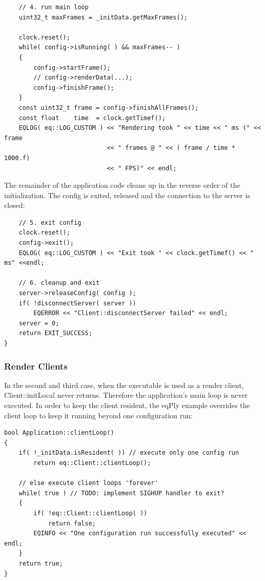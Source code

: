 \documentclass[10pt,a4]{scrartcl}
\begin{document}
{\footnotesize\begin{lstlisting}
    // 4. run main loop
    uint32_t maxFrames = _initData.getMaxFrames();
    
    clock.reset();
    while( config->isRunning( ) && maxFrames-- )
    {
        config->startFrame();
        // config->renderData(...);
        config->finishFrame();
    }
    const uint32_t frame = config->finishAllFrames();
    const float    time  = clock.getTimef();
    EQLOG( eq::LOG_CUSTOM ) << "Rendering took " << time << " ms (" << frame
                            << " frames @ " << ( frame / time * 1000.f)
                            << " FPS)" << endl;
\end{lstlisting}}%

The remainder of the application code cleans up in the reverse order of
the initialization. The config is exited, released and the connection to
the server is closed:

{\footnotesize\begin{lstlisting}
    // 5. exit config
    clock.reset();
    config->exit();
    EQLOG( eq::LOG_CUSTOM ) << "Exit took " << clock.getTimef() << " ms" <<endl;

    // 6. cleanup and exit
    server->releaseConfig( config );
    if( !disconnectServer( server ))
        EQERROR << "Client::disconnectServer failed" << endl;
    server = 0;
    return EXIT_SUCCESS;
}
\end{lstlisting}}%

\subsubsection{Render Clients}

In the second and third case, when the executable is used as a render
client, \textsf{Client::initLocal} never returns. Therefore the
application's main loop is never executed. In order to keep the client
resident, the \textsf{eqPly} example overrides the client loop to keep
it running beyond one configuration run:

{\footnotesize\begin{lstlisting}
bool Application::clientLoop()
{
    if( !_initData.isResident( )) // execute only one config run
        return eq::Client::clientLoop();

    // else execute client loops 'forever'
    while( true ) // TODO: implement SIGHUP handler to exit?
    {
        if( !eq::Client::clientLoop( ))
            return false;
        EQINFO << "One configuration run successfully executed" << endl;
    }
    return true;
}
\end{lstlisting}}%
\end{document}
